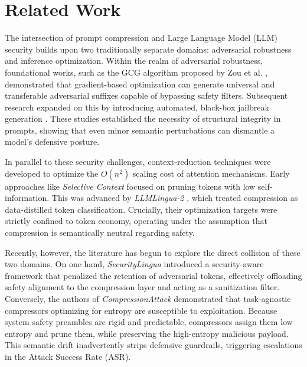 \documentclass[conference]{IEEEtran}
\begin{document}
\section{Related Work}

The intersection of prompt compression and Large Language Model (LLM) security builds upon two traditionally separate domains: adversarial robustness and inference optimization. Within the realm of adversarial robustness, foundational works, such as the GCG algorithm proposed by Zou et al. \cite{zou2023universal}, demonstrated that gradient-based optimization can generate universal and transferable adversarial suffixes capable of bypassing safety filters. Subsequent research expanded on this by introducing automated, black-box jailbreak generation \cite{chao2023jailbreaking}. These studies established the necessity of structural integrity in prompts, showing that even minor semantic perturbations can dismantle a model's defensive posture.

In parallel to these security challenges, context-reduction techniques were developed to optimize the $O(n^2)$ scaling cost of attention mechanisms. Early approaches like \textit{Selective Context} \cite{li2023compressing} focused on pruning tokens with low self-information. This was advanced by \mbox{\textit{LLMLingua-2}} \cite{pan2024llmlingua2}, which treated compression as data-distilled token classification. Crucially, their optimization targets were strictly confined to token economy, operating under the assumption that compression is semantically neutral regarding safety.

Recently, however, the literature has begun to explore the direct collision of these two domains. On one hand, \textit{SecurityLingua} \cite{li2025securitylingua} introduced a security-aware framework that penalized the retention of adversarial tokens, effectively offloading safety alignment to the compression layer and acting as a sanitization filter. Conversely, the authors of \textit{CompressionAttack} \cite{liu2025compressionattack} demonstrated that task-agnostic compressors optimizing for entropy are susceptible to exploitation. Because system safety preambles are rigid and predictable, compressors assign them low entropy and prune them, while preserving the high-entropy malicious payload. This semantic drift inadvertently strips defensive guardrails, triggering escalations in the Attack Success Rate (ASR).
\end{document}
